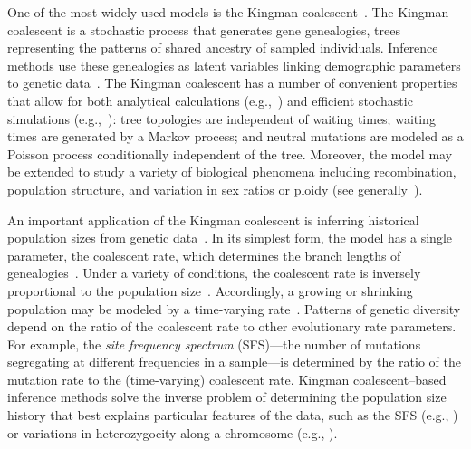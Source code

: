 \documentclass[11pt, letterpaper]{article}   	%
\begin{document}
One of the most widely used models is the Kingman coalescent~\autocite{Kingman1982a, Kingman1982b, Kingman1982c, Hudson1983, Tajima1983}.
The Kingman coalescent is a stochastic process that generates gene genealogies, trees representing the patterns of shared ancestry of sampled individuals.
Inference methods use these genealogies as latent variables linking demographic parameters to genetic data~\autocite{RosenbergNordborg2002}.
The Kingman coalescent has a number of convenient properties that allow for both analytical calculations (e.g.,~\cite{Tajima1989}) and efficient stochastic simulations (e.g.,~\cite{Hudson2002}): tree topologies are independent of waiting times; waiting times are generated by a Markov process; and neutral mutations are modeled as a Poisson process conditionally independent of the tree.
Moreover, the model may be extended to study a variety of biological phenomena including recombination, population structure, and variation in sex ratios or ploidy (see generally~\cite{Wakeley2009}).

An important application of the Kingman coalescent is inferring historical population sizes from genetic data~\autocite{SchraiberAkey2015}.
In its simplest form, the model has a single parameter, the coalescent rate, which determines the branch lengths of genealogies~\autocite{Kingman1982a}.
Under a variety of conditions, the coalescent rate is inversely proportional to the population size~\autocite{Kingman1982b}.
Accordingly, a growing or shrinking population may be modeled by a time-varying rate~\autocite{GriffithsTavare1994, GriffithsTavare1998}.
Patterns of genetic diversity depend on the ratio of the coalescent rate to other evolutionary rate parameters.
For example, the \emph{site frequency spectrum} (SFS)---the number of mutations segregating at different frequencies in a sample---is determined by the ratio of the mutation rate to the (time-varying) coalescent rate.
Kingman coalescent--based inference methods solve the inverse problem of determining the population size history that best explains particular features of the data, such as the SFS (e.g., \cite{BhaskarEtAl2015}) or variations in heterozygocity along a chromosome (e.g., \cite{LiDurbin2011}).
\end{document}

